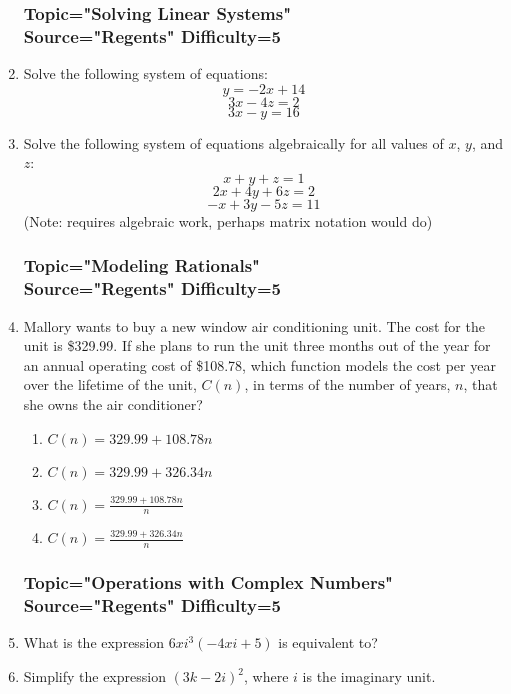 \documentclass[12pt, oneside]{article}
\begin{document}
\begin{enumerate}
\subsubsection*{Topic="Solving Linear Systems"\\
Source="Regents" 
Difficulty=5}

\item Solve the following system of equations:
\[y=-2x+14\]
\[3x - 4z = 2\]
\[3x - y  = 16\]

\item Solve the following system of equations algebraically for all values of $x$, $y$, and $z$:
\[x +y+ z=1\]
\[2x+4y+6z=2\]
\[-x+3y-5z=11\]
(Note: requires algebraic work, perhaps matrix notation would do)

\subsubsection*{Topic="Modeling Rationals"\\
Source="Regents" 
Difficulty=5}

\item Mallory wants to buy a new window air conditioning unit. The cost for the unit is \$329.99. If she plans to run the unit three months out of the year for an annual operating cost of \$108.78, which function models the cost per year over the lifetime of the unit, $C(n)$, in terms of the number of years, $n$, that she owns the air conditioner?
\begin{enumerate}
    \item $C(n)=329.99+108.78n$
    \item $C(n)=329.99+326.34n$
    \item $\displaystyle C(n)=\frac{329.99+108.78n}{n}$
    \item $\displaystyle C(n)=\frac{329.99+326.34n}{n}$
\end{enumerate} %

\subsubsection*{Topic="Operations with Complex Numbers"\\
Source="Regents" 
Difficulty=5}

\item What is the expression $6xi^3(-4xi+5)$ is equivalent to?  %

\item Simplify the expression $(3k - 2i)^2$, where $i$ is the imaginary unit. %


\end{enumerate}
\end{document}
